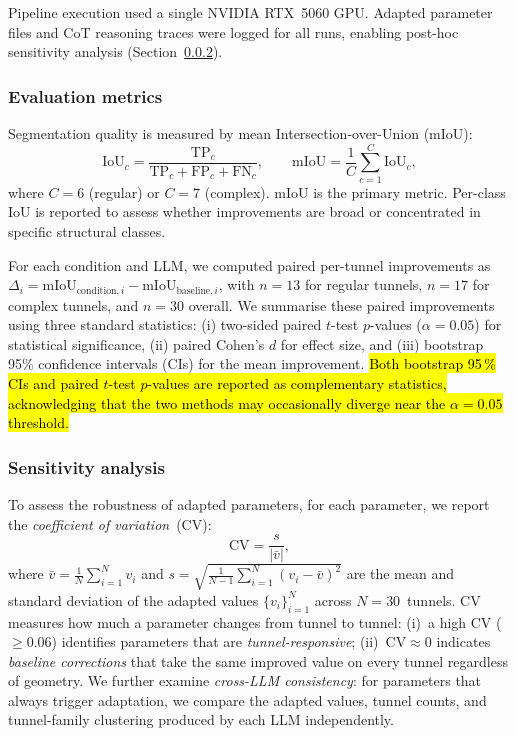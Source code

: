 \documentclass[a4paper,fleqn]{cas-dc}
\begin{document}
{Pipeline execution used a single NVIDIA RTX~5060 GPU. Adapted parameter files and CoT reasoning traces were logged for all runs, enabling post-hoc sensitivity analysis (Section~\ref{sec:sensitivity-method}).

\subsubsection{Evaluation metrics}\label{sec:metrics}

Segmentation quality is measured by mean Intersection-over-Union (mIoU):
\begin{equation}
\text{IoU}_c = \frac{\text{TP}_c}{\text{TP}_c + \text{FP}_c + \text{FN}_c}, \qquad
\text{mIoU} = \frac{1}{C} \sum_{c=1}^{C} \text{IoU}_c,
\end{equation}
where $C = 6$ (regular) or $C = 7$ (complex). mIoU is the primary metric. Per-class IoU is reported to assess whether improvements are broad or concentrated in specific structural classes.

For each condition and LLM, we computed paired per-tunnel improvements as $\Delta_i = \mathrm{mIoU}_{\text{condition},i} - \mathrm{mIoU}_{\text{baseline},i}$, with $n=13$ for regular tunnels, $n=17$ for complex tunnels, and $n=30$ overall. We summarise these paired improvements using three standard statistics: (i) two-sided paired $t$-test $p$-values ($\alpha = 0.05$) for statistical significance, (ii) paired Cohen's $d$ for effect size, and (iii) bootstrap 95\% confidence intervals (CIs) for the mean improvement. \hl{Both bootstrap 95\,\% CIs and paired $t$-test $p$-values are reported as complementary statistics, acknowledging that the two methods may occasionally diverge near the $\alpha = 0.05$ threshold.}

\subsubsection{Sensitivity analysis}\label{sec:sensitivity-method}

To assess the robustness of adapted parameters, for each parameter, we report the \emph{coefficient of variation}~(CV):
\begin{equation}\label{eq:cv}
\text{CV} = \frac{s}{\lvert\bar{v}\rvert},
\end{equation}
where $\bar{v} = \frac{1}{N}\sum_{i=1}^{N} v_i$ and $s = \sqrt{\frac{1}{N-1}\sum_{i=1}^{N}(v_i - \bar{v})^2}$ are the mean and standard deviation of the adapted values $\{v_i\}_{i=1}^{N}$ across $N = 30$~tunnels. CV measures how much a parameter changes from tunnel to tunnel: (i)~a high CV ($\geq 0.06$) identifies parameters that are \emph{tunnel-responsive}; (ii)~$\text{CV} \approx 0$ indicates \emph{baseline corrections} that take the same improved value on every tunnel regardless of geometry. We further examine \emph{cross-LLM consistency}: for parameters that always trigger adaptation, we compare the adapted values, tunnel counts, and tunnel-family clustering produced by each LLM independently.






}
\end{document}
